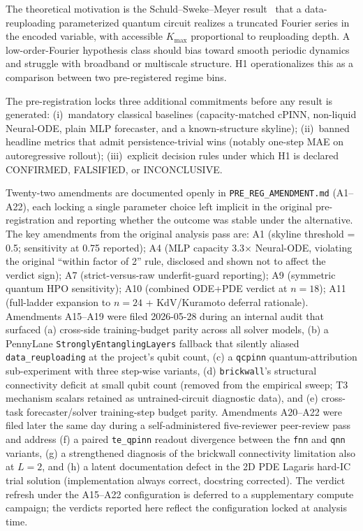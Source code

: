 The theoretical motivation is the Schuld--Sweke--Meyer
result~\cite{schuld2021effect} that a data-reuploading parameterized
quantum circuit realizes a truncated Fourier series in the encoded
variable, with accessible $K_\text{max}$ proportional to reuploading
depth. A low-order-Fourier hypothesis class should bias toward smooth
periodic dynamics and struggle with broadband or multiscale structure.
H1 operationalizes this as a comparison between two pre-registered
regime bins.

The pre-registration locks three additional commitments before
any result is generated: (i)~mandatory classical baselines
(capacity-matched cPINN, non-liquid Neural-ODE, plain MLP
forecaster, and a known-structure skyline); (ii)~banned headline
metrics that admit persistence-trivial wins (notably one-step MAE
on autoregressive rollout); (iii)~explicit decision rules under
which H1 is declared CONFIRMED, FALSIFIED, or INCONCLUSIVE.

Twenty-two amendments are documented
openly in \texttt{PRE\_REG\_AMENDMENT.md} (A1--A22), each locking a
single parameter choice left implicit in the original
pre-registration and reporting whether the outcome was stable under
the alternative. The key amendments from the original analysis
pass are: A1 (skyline threshold = 0.5; sensitivity at 0.75
reported); A4 (MLP capacity 3.3$\times$ Neural-ODE, violating the
original ``within factor of 2'' rule, disclosed and shown not to
affect the verdict sign); A7 (strict-versus-raw underfit-guard
reporting); A9 (symmetric quantum HPO sensitivity); A10 (combined
ODE+PDE verdict at $n=18$); A11 (full-ladder expansion to $n=24$
+ KdV/Kuramoto deferral rationale). Amendments A15--A19 were
filed 2026-05-28 during an internal audit that surfaced
(a) cross-side training-budget parity across all solver models,
(b) a PennyLane \texttt{StronglyEntanglingLayers} fallback that
silently aliased \texttt{data\_reuploading} at the project's
qubit count, (c) a \texttt{qcpinn} quantum-attribution
sub-experiment with three step-wise variants, (d)
\texttt{brickwall}'s structural connectivity deficit at small
qubit count (removed from the empirical sweep; T3 mechanism
scalars retained as untrained-circuit diagnostic data), and
(e) cross-task forecaster/solver training-step budget parity.
Amendments A20--A22 were filed later the same day during a
self-administered five-reviewer peer-review pass and address
(f) a paired \texttt{te\_qpinn} readout divergence between the
\texttt{fnn} and \texttt{qnn} variants, (g) a strengthened
diagnosis of the brickwall connectivity limitation also at
$L = 2$, and (h) a latent documentation defect in the 2D PDE
Lagaris hard-IC trial solution (implementation always correct,
docstring corrected). The verdict refresh under the A15--A22
configuration is deferred to a supplementary compute campaign; the
verdicts reported here reflect the configuration locked at analysis time.

